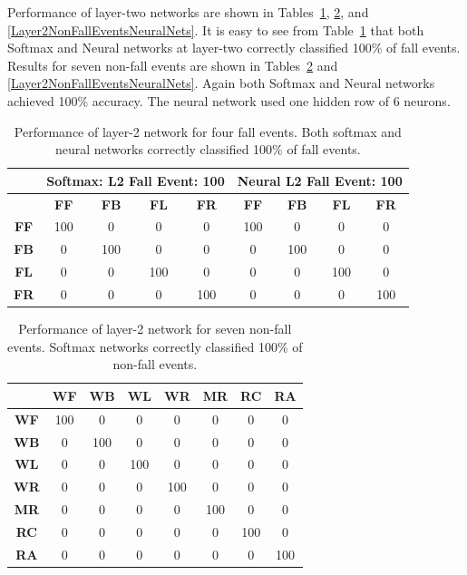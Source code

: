 \documentclass{IEEEtran}
\begin{document}
Performance of layer-two networks are shown in Tables~\ref{Layer2FallEvents}, \ref{Layer2NonFallEventsSoftmax}, and \ref{Layer2NonFallEventsNeuralNets}. It is easy to see from Table~\ref{Layer2FallEvents} that both Softmax and Neural networks at layer-two correctly classified 100\% of fall events.
Results for seven non-fall events are shown in Tables~\ref{Layer2NonFallEventsSoftmax} and 
\ref{Layer2NonFallEventsNeuralNets}. Again both Softmax and Neural networks achieved 100\% accuracy. The neural network used one hidden row of 6 neurons.
\begin{table}[htb]
\resizebox{\columnwidth}{!}
{
\begin{tabular}{|c|c|c|c|c||c|c|c|c|}
\hline 
& \multicolumn{4}{c||}{\bf Softmax: L2 Fall Event: 100} & \multicolumn{4}{c|}{\bf Neural 
L2 Fall Event: 100} \\ \hline
& \textbf{FF} & \textbf{FB}  & \textbf{FL} & \textbf{FR} & \textbf{FF} & \textbf{FB}  & 
\textbf{FL} & \textbf{FR} \\ \hline
\textbf{FF} & 100 &  0 &  0 &  0  & 100 &  0 &  0 &  0\\ \hline
\textbf{FB} & 0 &  100 &  0 &  0  & 0 &  100 &  0 &  0\\ \hline
\textbf{FL} & 0 &  0 &  100 &  0  & 0 &  0 &  100 &  0\\ \hline
\textbf{FR} & 0 &  0 &  0 &  100  & 0 &  0 &  0 &  100 \\ \hline
\end{tabular}
}
\caption{ Performance of layer-2 network for  four fall events. Both softmax and neural networks correctly classified 100\% of fall events.}
\label{Layer2FallEvents}
\end{table}



\begin{table}[htb]
\caption{Performance of layer-2 network for  seven non-fall events. Softmax networks correctly classified 100\% of non-fall events.}
\label{Layer2NonFallEventsSoftmax}
\centering
{
\begin{tabular}{|c|c|c|c|c|c|c|c|}
\hline 
 & \textbf{WF} & \textbf{WB} & \textbf{WL} & \textbf{WR} & \textbf{MR} & 
\textbf{RC} & \textbf{RA} \\ \hline    
\textbf{WF} & 100 &  0 &  0 &  0 &  0 &  0 &  0 \\ \hline
\textbf{WB} & 0 &  100 &  0 &  0 &  0 &  0 &  0 \\ \hline
\textbf{WL} & 0 &  0 &  100 &  0 &  0 &  0 &  0 \\ \hline
\textbf{WR} & 0 &  0 &  0 &  100 &  0 &  0 &  0 \\ \hline
\textbf{MR} & 0 &  0 &  0 &  0 &  100 &  0 &  0 \\ \hline
\textbf{RC} & 0 &  0 &  0 &  0 &  0 &  100 &  0 \\ \hline
\textbf{RA} & 0 &  0 &  0 &  0 &  0 &  0 &  100 \\ \hline
\end{tabular}
}
\end{table}
\end{document}
